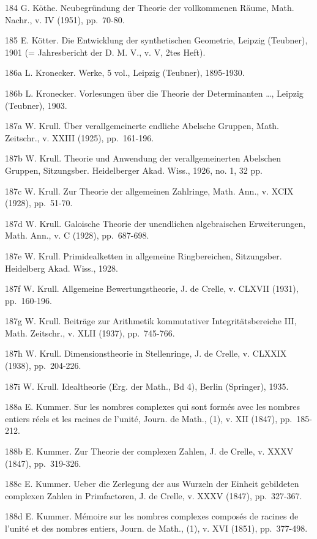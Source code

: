184 G. Köthe. Neubegründung der Theorie der vollkommenen Räume, Math. Nachr., v. IV (1951), pp.~70-80.

185 E. Kötter. Die Entwicklung der synthetischen Geometrie, Leipzig (Teubner), 1901 (= Jahresbericht der D. M. V., v. V, 2tes Heft).

186a L. Kronecker. Werke, 5 vol., Leipzig (Teubner), 1895-1930.

186b L. Kronecker. Vorlesungen über die Theorie der Determinanten \ldots, Leipzig (Teubner), 1903.

187a W. Krull. Über verallgemeinerte endliche Abelsche Gruppen, Math. Zeitschr., v. XXIII (1925), pp.~161-196.

187b W. Krull. Theorie und Anwendung der verallgemeinerten Abelschen Gruppen, Sitzungsber. Heidelberger Akad. Wiss., 1926, no. 1, 32 pp.

187c W. Krull. Zur Theorie der allgemeinen Zahlringe, Math. Ann., v. XCIX (1928), pp.~51-70.

187d W. Krull. Galoische Theorie der unendlichen algebraischen Erweiterungen, Math. Ann., v. C (1928), pp.~687-698.

187e W. Krull. Primidealketten in allgemeine Ringbereichen, Sitzungsber. Heidelberg Akad. Wiss., 1928.

187f W. Krull. Allgemeine Bewertungstheorie, J. de Crelle, v. CLXVII (1931), pp.~160-196.

187g W. Krull. Beiträge zur Arithmetik kommutativer Integritätsbereiche III, Math. Zeitschr., v. XLII (1937), pp.~745-766.

187h W. Krull. Dimensionstheorie in Stellenringe, J. de Crelle, v. CLXXIX (1938), pp.~204-226.

187i W. Krull. Idealtheorie (Erg. der Math., Bd 4), Berlin (Springer), 1935.

188a E. Kummer. Sur les nombres complexes qui sont formés avec les nombres entiers réels et les racines de l'unité, Journ. de Math., (1), v. XII (1847), pp.~185-212.

188b E. Kummer. Zur Theorie der complexen Zahlen, J. de Crelle, v. XXXV (1847), pp.~319-326.

188c E. Kummer. Ueber die Zerlegung der aus Wurzeln der Einheit gebildeten complexen Zahlen in Primfactoren, J. de Crelle, v. XXXV (1847), pp.~327-367.

188d E. Kummer. Mémoire sur les nombres complexes composés de racines de l'unité et des nombres entiers, Journ. de Math., (1), v. XVI (1851), pp.~377-498.

